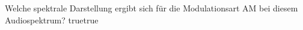     {Welche spektrale Darstellung ergibt sich für die Modulationsart AM bei diesem  Audiospektrum?}
    {}
    {}
    {}
    {}
    {true}{true}